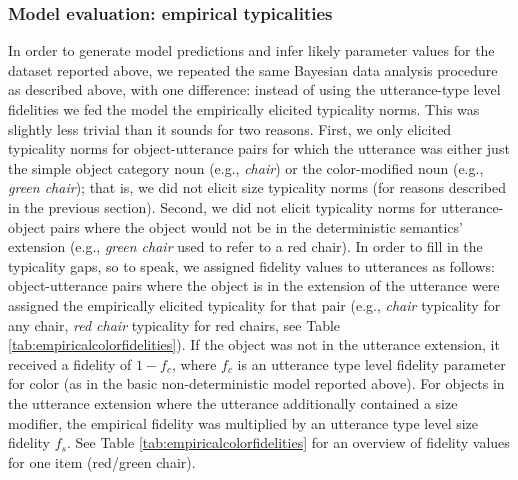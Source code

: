 \documentclass[11pt]{article}
\newcommand{\tableref}[1]{Table \ref{#1}}
\begin{document}
\subsubsection{Model evaluation: empirical typicalities}

In order to generate model predictions and infer likely parameter values for the dataset reported above,  we repeated the same Bayesian data analysis procedure as described above, with one difference: instead of using the utterance-type level fidelities we fed the model the empirically elicited typicality norms. This was slightly less trivial than it sounds for two reasons. First, we only elicited typicality norms for object-utterance pairs for which the utterance was either just the simple object category noun (e.g., \emph{chair}) or the color-modified noun (e.g., \emph{green chair}); that is, we did not elicit size typicality norms (for reasons described in the previous section). Second, we did not elicit typicality norms for utterance-object pairs where the object would not be in the deterministic semantics' extension (e.g., \emph{green chair} used to refer to a red chair). In order to fill in the typicality gaps, so to speak, we assigned fidelity values to utterances as follows: object-utterance pairs where the object is in the extension of the utterance were assigned the empirically elicited typicality for that pair (e.g., \emph{chair} typicality for any chair, \emph{red chair} typicality for red chairs, see \tableref{tab:empiricalcolorfidelities}). If the object was not in the utterance extension, it received a fidelity of $1 - f_{c}$, where $f_c$ is an utterance type level fidelity parameter for color (as in the basic non-deterministic model reported above). For objects in the utterance extension where the utterance additionally contained a size modifier, the empirical fidelity was multiplied by an utterance type level size fidelity $f_{s}$. See \tableref{tab:empiricalcolorfidelities} for an overview of fidelity values for one item (red/green chair). 
\end{document}
